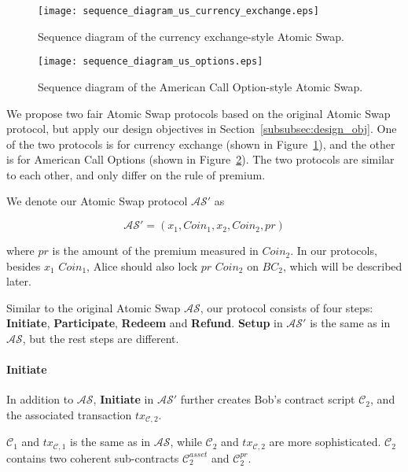 \begin{figure}
    \texttt{[image: sequence\_diagram\_us\_currency\_exchange.eps]}
    \caption{Sequence diagram of the currency exchange-style Atomic Swap.}
    \label{fig:sequence_diagram_us_currency_exchange}
\end{figure}

\begin{figure}
    \texttt{[image: sequence\_diagram\_us\_options.eps]}
    \caption{Sequence diagram of the American Call Option-style Atomic Swap.}
    \label{fig:sequence_diagram_us_options}
\end{figure}


We propose two fair Atomic Swap protocols based on the original Atomic Swap protocol, but apply our design objectives in Section~\ref{subsubsec:design_obj}.
One of the two protocols is for currency exchange (shown in Figure~\ref{fig:sequence_diagram_us_currency_exchange}), and the other is for American Call Options (shown in Figure~\ref{fig:sequence_diagram_us_options}).
The two protocols are similar to each other, and only differ on the rule of premium. 

We denote our Atomic Swap protocol $\mathcal{AS}'$ as

$$\mathcal{AS}' = (x_1, Coin_1, x_2, Coin_2, pr)$$

where $pr$ is the amount of the premium measured in $Coin_2$.
In our protocols, besides $x_1$ $Coin_1$, Alice should also lock $pr$ $Coin_2$ on $BC_2$, which will be described later.

Similar to the original Atomic Swap $\mathcal{AS}$, our protocol consists of four steps:
\textbf{Initiate}, \textbf{Participate}, \textbf{Redeem} and \textbf{Refund}.
\textbf{Setup} in $\mathcal{AS}'$ is the same as in $\mathcal{AS}$, but the rest steps are different. 

\paragraph{\textbf{Initiate}}
In addition to $\mathcal{AS}$, \textbf{Initiate} in $\mathcal{AS}'$ further creates Bob's contract script $\mathcal{C}_2$, and
the associated transaction $tx_{\mathcal{C}, 2}$.

$\mathcal{C}_1$ and $tx_{\mathcal{C}, 1}$ is the same as in $\mathcal{AS}$,
while $\mathcal{C}_2$ and $tx_{\mathcal{C}, 2}$ are more sophisticated.
$\mathcal{C}_2$ contains two coherent sub-contracts $\mathcal{C}^{asset}_2$ and $\mathcal{C}^{pr}_2$.

